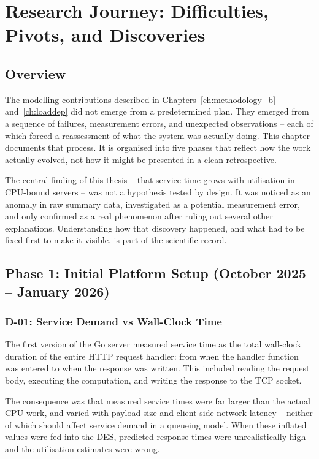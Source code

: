 ﻿\chapter{Research Journey: Difficulties, Pivots, and Discoveries}
\label{ch:journey}

\section{Overview}

The modelling contributions described in Chapters~\ref{ch:methodology_b} and~\ref{ch:loaddep} did not emerge from a predetermined plan. They emerged from a sequence of failures, measurement errors, and unexpected observations -- each of which forced a reassessment of what the system was actually doing. This chapter documents that process. It is organised into five phases that reflect how the work actually evolved, not how it might be presented in a clean retrospective.

The central finding of this thesis -- that service time grows with utilisation in CPU-bound servers -- was not a hypothesis tested by design. It was noticed as an anomaly in raw summary data, investigated as a potential measurement error, and only confirmed as a real phenomenon after ruling out several other explanations. Understanding how that discovery happened, and what had to be fixed first to make it visible, is part of the scientific record.

\section{Phase 1: Initial Platform Setup (October 2025 -- January 2026)}
\label{sec:journey-phase1}

\subsection{D-01: Service Demand vs Wall-Clock Time}

The first version of the Go server measured service time as the total wall-clock duration of the entire HTTP request handler: from when the handler function was entered to when the response was written. This included reading the request body, executing the computation, and writing the response to the TCP socket.

The consequence was that measured service times were far larger than the actual CPU work, and varied with payload size and client-side network latency -- neither of which should affect service demand in a queueing model. When these inflated values were fed into the DES, predicted response times were unrealistically high and the utilisation estimates were wrong.


